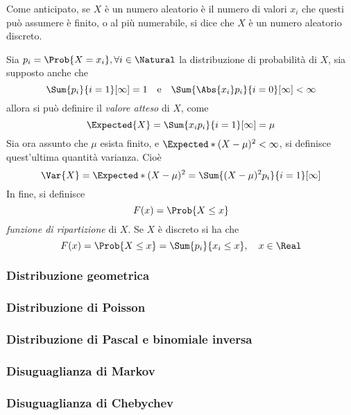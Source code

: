 \documentclass{subfiles}
\begin{document}
Come anticipato, se $X$ è un numero aleatorio è il numero di valori $x_{i}$ che questi può assumere è finito, o al più numerabile,
si dice che $X$ è un numero aleatorio discreto.

Sia $p_{i} = \Prob{X = x_{i}}, \forall i \in \Natural$ la distribuzione di probabilità di $X$, sia supposto anche che
$$
    \Sum{p_i}{i = 1}[\infty] = 1 \quad \text{e} \quad \Sum{\Abs{x_{i}} p_i}{i = 0}[\infty] < \infty
$$
allora si può definire il \emph{valore atteso} di $X$, come
$$
    \Expected{X} = \Sum{x_{i} p_{i}}{i = 1}[\infty] = \mu
$$
Sia ora assunto che $\mu$ esista finito, e $\Expected*{(X - \mu)^{2}} < \infty$, si definisce quest'ultima quantità varianza.
Cioè
$$
    \Var{X} = \Expected*{(X - \mu)^{2}} = \Sum{(X - \mu)^{2} p_{i}}{i = 1}[\infty]
$$
In fine, si definisce
$$
    F(x) = \Prob{X \le x}
$$
\emph{funzione di ripartizione} di $X$. Se $X$ è discreto si ha che
$$
    F(x) = \Prob{X \le x} = \Sum{p_{i}}{x_{i} \le x}, \quad x \in \Real
$$

\subsubsection{Distribuzione geometrica}


\subsubsection{Distribuzione di Poisson}


\subsubsection{Distribuzione di Pascal e binomiale inversa}


\subsubsection{Disuguaglianza di Markov}


\subsubsection{Disuguaglianza di Chebychev}

\end{document}
